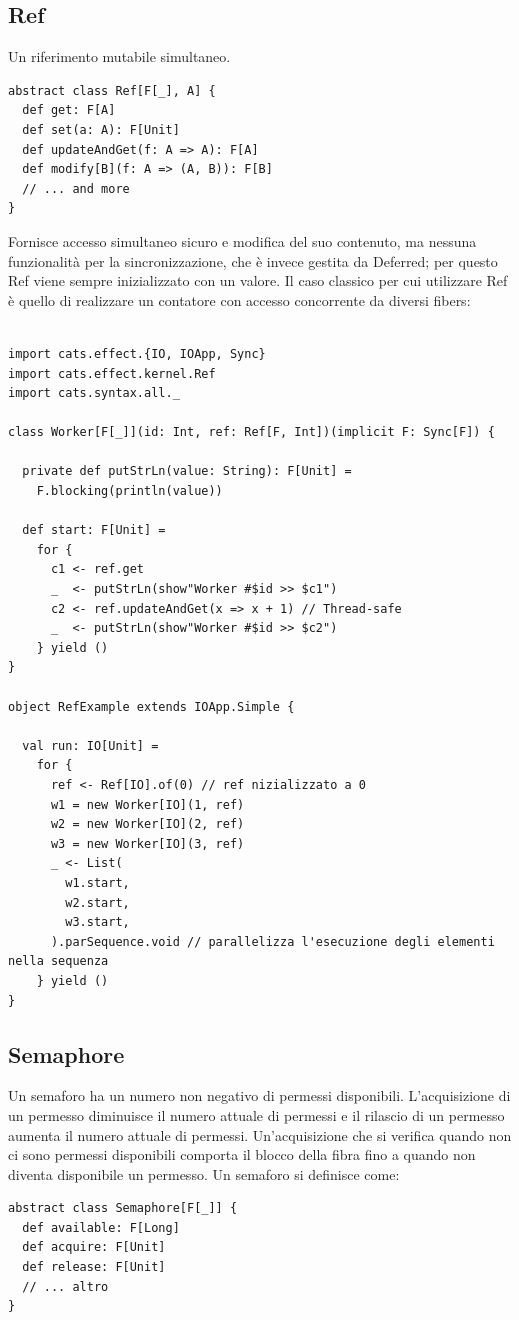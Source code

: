 \subsection{Ref}
Un riferimento mutabile simultaneo.
\begin{verbatim}
abstract class Ref[F[_], A] {
  def get: F[A]
  def set(a: A): F[Unit]
  def updateAndGet(f: A => A): F[A]
  def modify[B](f: A => (A, B)): F[B]
  // ... and more
}
\end{verbatim}
Fornisce accesso simultaneo sicuro e modifica del suo contenuto, ma nessuna funzionalità per la sincronizzazione, che è invece gestita da Deferred; per questo Ref viene sempre inizializzato con un valore. Il caso classico per cui utilizzare Ref è quello di realizzare un contatore con accesso concorrente da diversi fibers:

\begin{verbatim}

import cats.effect.{IO, IOApp, Sync}
import cats.effect.kernel.Ref
import cats.syntax.all._

class Worker[F[_]](id: Int, ref: Ref[F, Int])(implicit F: Sync[F]) {

  private def putStrLn(value: String): F[Unit] =
    F.blocking(println(value))

  def start: F[Unit] =
    for {
      c1 <- ref.get
      _  <- putStrLn(show"Worker #$id >> $c1")
      c2 <- ref.updateAndGet(x => x + 1) // Thread-safe
      _  <- putStrLn(show"Worker #$id >> $c2")
    } yield ()
}

object RefExample extends IOApp.Simple {

  val run: IO[Unit] =
    for {
      ref <- Ref[IO].of(0) // ref nizializzato a 0
      w1 = new Worker[IO](1, ref)
      w2 = new Worker[IO](2, ref)
      w3 = new Worker[IO](3, ref)
      _ <- List(
        w1.start,
        w2.start,
        w3.start,
      ).parSequence.void // parallelizza l'esecuzione degli elementi nella sequenza
    } yield ()
}
\end{verbatim}

\subsection{Semaphore}
Un semaforo ha un numero non negativo di permessi disponibili. L'acquisizione di un permesso diminuisce il numero attuale di permessi e il rilascio di un permesso aumenta il numero attuale di permessi. Un'acquisizione che si verifica quando non ci sono permessi disponibili comporta il blocco della fibra fino a quando non diventa disponibile un permesso. Un semaforo si definisce come:
\begin{verbatim}
abstract class Semaphore[F[_]] {
  def available: F[Long]
  def acquire: F[Unit]
  def release: F[Unit]
  // ... altro
}
    
\end{verbatim}

